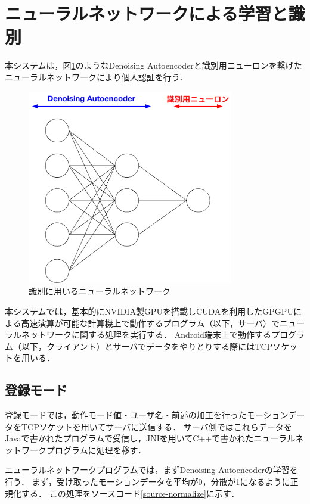 \section{ニューラルネットワークによる学習と識別}
本システムは，図\ref{system-nn}のようなDenoising Autoencoderと識別用ニューロンを繋げたニューラルネットワークにより個人認証を行う．


\begin{figure}[hbtp]
  \centering
  \includegraphics[bb=0 0 622 587, width=9cm]{Figures/system-nn.pdf}
  \caption{識別に用いるニューラルネットワーク}
  \label{system-nn}
\end{figure}

本システムでは，基本的にNVIDIA製GPUを搭載しCUDA\cite{4-cuda}を利用したGPGPUによる高速演算が可能な計算機上で動作するプログラム（以下，サーバ）でニューラルネットワークに関する処理を実行する．
Android端末上で動作するプログラム（以下，クライアント）とサーバでデータをやりとりする際にはTCPソケットを用いる．

\subsection{登録モード}
登録モードでは，動作モード値・ユーザ名・前述の加工を行ったモーションデータをTCPソケットを用いてサーバに送信する．
サーバ側ではこれらデータをJavaで書かれたプログラムで受信し，JNI\cite{4-jni}を用いてC++で書かれたニューラルネットワークプログラムに処理を移す．

ニューラルネットワークプログラムでは，まずDenoising Autoencoderの学習を行う．
まず，受け取ったモーションデータを平均が0，分散が1になるように正規化する．
この処理をソースコード\ref{source-normalize}に示す．

